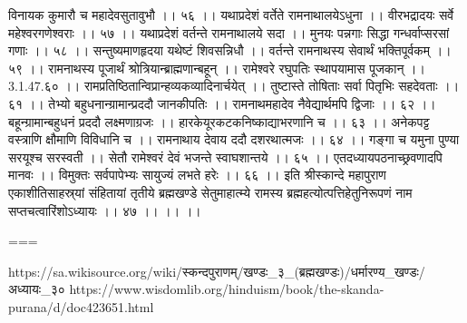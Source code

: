 विनायक कुमारौ च महादेवसुतावुभौ ।। ५६ ।।
यथाप्रदेशं वर्तेते रामनाथालयेऽधुना ।।
वीरभद्रादयः सर्वे महेश्वरगणेश्वराः ।। ५७ ।।
यथाप्रदेशं वर्तन्ते रामनाथालये सदा ।।
मुनयः पन्नगाः सिद्धा गन्धर्वाप्सरसां गणाः ।। ५८ ।।
सन्तुष्यमाणहृदया यथेष्टं शिवसन्निधौ ।।
वर्तन्ते रामनाथस्य सेवार्थं भक्तिपूर्वकम् ।। ५९ ।।
रामनाथस्य पूजार्थं श्रोत्रियान्ब्राह्मणान्बहून् ।।
रामेश्वरे रघुपतिः स्थापयामास पूजकान् ।। 3.1.47.६० ।।
रामप्रतिष्ठितान्विप्रान्हव्यकव्यादिनार्चयेत् ।।
तुष्टास्ते तोषिताः सर्वा पितृभिः सहदेवताः ।। ६१ ।।
तेभ्यो बहुधनान्ग्रामान्प्रददौ जानकीपतिः ।।
रामनाथमहादेव नैवेद्यार्थमपि द्विजाः ।। ६२ ।।
बहून्ग्रामान्बहुधनं प्रददौ लक्ष्मणाग्रजः ।।
हारकेयूरकटकनिष्काद्याभरणानि च ।। ६३ ।।
अनेकपट्ट वस्त्राणि क्षौमाणि विविधानि च ।।
रामनाथाय देवाय ददौ दशरथात्मजः ।। ६४ ।।
गङ्गा च यमुना पुण्या सरयूश्च सरस्वती ।।
सेतौ रामेश्वरं देवं भजन्ते स्वाघशान्तये ।। ६५ ।।
एतदध्यायपठनाच्छ्रवणादपि मानवः ।।
विमुक्तः सर्वपापेभ्यः सायुज्यं लभते हरेः ।। ६६ ।।
इति श्रीस्कान्दे महापुराण एकाशीतिसाहस्र्यां संहितायां तृतीये ब्रह्मखण्डे सेतुमाहात्म्ये रामस्य ब्रह्महत्योत्पत्तिहेतुनिरूपणं नाम सप्तचत्वारिंशोऽध्यायः ।। ४७ ।। ।। ।।

===

https://sa.wikisource.org/wiki/स्कन्दपुराणम्/खण्डः_३_(ब्रह्मखण्डः)/धर्मारण्य_खण्डः/अध्यायः_३०
https://www.wisdomlib.org/hinduism/book/the-skanda-purana/d/doc423651.html

